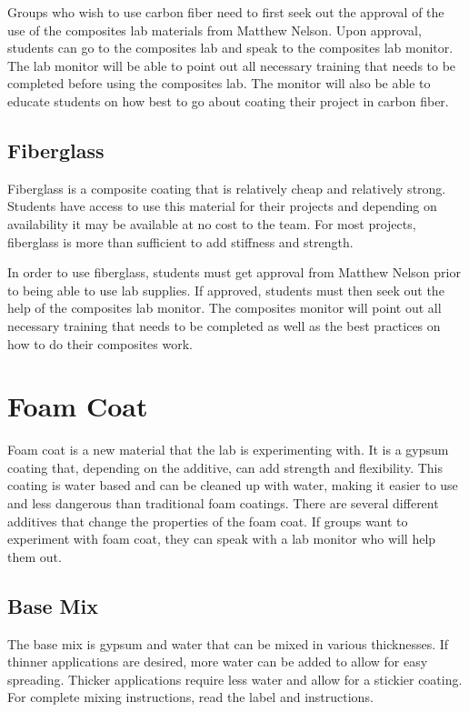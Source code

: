 Groups who wish to use carbon fiber need to first seek out the approval of the use of the composites lab materials from Matthew Nelson. Upon approval, students can go to the composites lab and speak to the composites lab monitor. The lab monitor will be able to point out all necessary training that needs to be completed before using the composites lab. The monitor will also be able to educate students on how best to go about coating their project in carbon fiber.

\subsection{Fiberglass}
Fiberglass is a composite coating that is relatively cheap and relatively strong. Students have access to use this material for their projects and depending on availability it may be available at no cost to the team. For most projects, fiberglass is more than sufficient to add stiffness and strength. 

In order to use fiberglass, students must get approval from Matthew Nelson prior to being able to use lab supplies. If approved, students must then seek out the help of the composites lab monitor. The composites monitor will point out all necessary training that needs to be completed as well as the best practices on how to do their composites work.

\section{Foam Coat}
Foam coat is a new material that the lab is experimenting with. It is a gypsum coating that, depending on the additive, can add strength and flexibility. This coating is water based and can be cleaned up with water, making it easier to use and less dangerous than traditional foam coatings. There are several different additives that change the properties of the foam coat. If groups want to experiment with foam coat, they can speak with a lab monitor who will help them out.

\subsection{Base Mix}
The base mix is gypsum and water that can be mixed in various thicknesses. If thinner applications are desired, more water can be added to allow for easy spreading. Thicker applications require less water and allow for a stickier coating. For complete mixing instructions, read the label and instructions.

